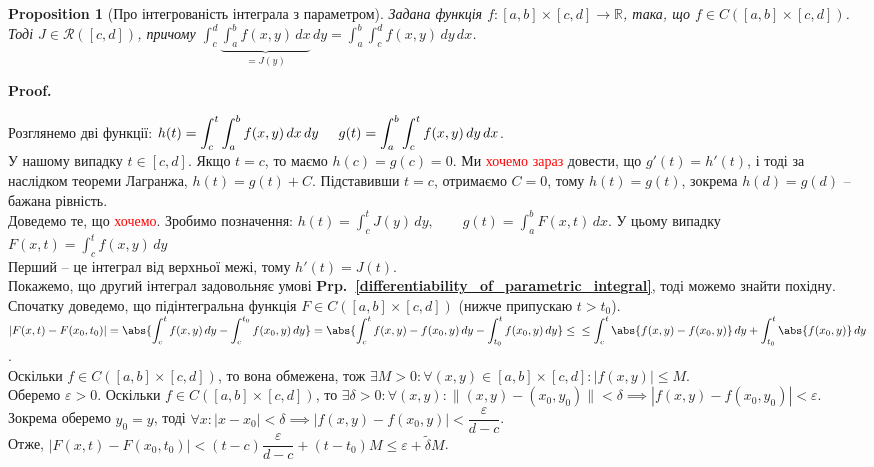 \documentclass[a4paper, 10pt]{article}
\makeatletter
\def\huge{\displaystyle}
\def\qed{$\blacksquare$}
\theoremstyle{theoremdd}
\theoremstyle{theoremdd}
\theoremstyle{theoremdd}
\theoremstyle{theoremdd}
\theoremstyle{theoremdd}
\theoremstyle{theoremdd}
\newtheorem{proposition}[theorem]{Proposition}
\theoremstyle{theoremdd}
\theoremstyle{theoremdd}
\theoremstyle{theoremdd}
\newcommand\prpref[1]{\textbf{Prp.~\ref{#1}}}
\renewenvironment{proof}[1][Proof.\\]{\par
\pushQED{\hfill \qed}%
\normalfont \topsep6\p@\@plus6\p@\relax
\trivlist
\item\relax
{\bfseries
#1\@addpunct{.}}\hspace\labelsep\ignorespaces
}{%
\popQED\endtrivlist\@endpefalse
}
\makeatother
\begin{document}
\begin{proposition}[Про інтегрованість інтеграла з параметром]
Задана функція $f \colon [a,b] \times [c,d] \to \mathbb{R}$, така, що $f \in C([a,b] \times [c,d])$. Тоді $J \in \mathcal{R}([c,d])$, причому $\huge \int_c^d \underbrace{\int_a^b f(x,y)\,dx}_{=J(y)}\,dy = \int_a^b \int_c^d f(x,y)\,dy \,dx$.
\end{proposition}

\begin{proof}
Розглянемо дві функції: $h(t) = \huge \int_c^t \int_a^b f(x,y) \,dx \,dy \hspace{0.5cm} g(t) = \int_a^b \int_c^t f(x,y)\,dy\,dx$. \\
У нашому випадку $t \in [c,d]$. Якщо $t = c$, то маємо $h(c) = g(c) = 0$. Ми \textcolor{red}{хочемо зараз} довести, що $g'(t) = h'(t)$, і тоді за наслідком теореми Лагранжа, $h(t) = g(t) + C$. Підставивши $t = c$, отримаємо $C = 0$, тому $h(t) = g(t)$, зокрема $h(d) = g(d)$ -- бажана рівність.\\
Доведемо те, що \textcolor{red}{хочемо}. Зробимо позначення: $h(t) = \huge \int_c^t J(y) \,dy, \qquad g(t) = \int_a^b F(x,t)\,dx$. У цьому випадку $F(x,t) = \displaystyle\int_c^t f(x,y)\,dy$\\
Перший -- це інтеграл від верхньої межі, тому $h'(t) = J(t)$.\\
Покажемо, що другий інтеграл задовольняє умові \prpref{differentiability_of_parametric_integral}, тоді можемо знайти похідну.\\
Спочатку доведемо, що підінтегральна функція $F \in C([a,b] \times [c,d])$ (нижче припускаю $t > t_0$).\\
$\displaystyle \left|F(x,t) - F(x_0,t_0)\right| = \abs{\int_c^t f(x,y)\,dy - \int_c^{t_0} f(x_0,y)\,dy} =\abs{\int_c^t f(x,y)-f(x_0,y)\,dy - \int_{t_0}^t f(x_0,y)\,dy} \leq \\
\leq \int_c^t \abs{ f(x,y) - f(x_0,y) }\,dy + \int_{t_0}^t \abs{f(x_0,y)}\,dy$.\\
Оскільки $f \in C([a,b] \times [c,d])$, то вона обмежена, тож $\exists M > 0: \forall (x,y) \in [a,b] \times [c,d]: |f(x,y)| \leq M$.\\
Оберемо $\varepsilon > 0$. Оскільки $f \in C([a,b] \times [c,d])$, то $\exists \delta > 0: \forall (x,y): \| (x,y) - (x_0,y_0) \| < \delta \implies |f(x,y) - f(x_0,y_0)| < \varepsilon$. Зокрема оберемо $y_0 = y$, тоді $\forall x: |x-x_0| < \delta \implies |f(x,y) - f(x_0,y)| < \dfrac{\varepsilon}{d-c}$.\\
Отже, $|F(x,t) - F(x_0,t_0)| < (t-c) \dfrac{\varepsilon}{d-c} + (t-t_0) M \leq \varepsilon + \tilde{\delta} M$.\\

\end{proof}
\end{document}
